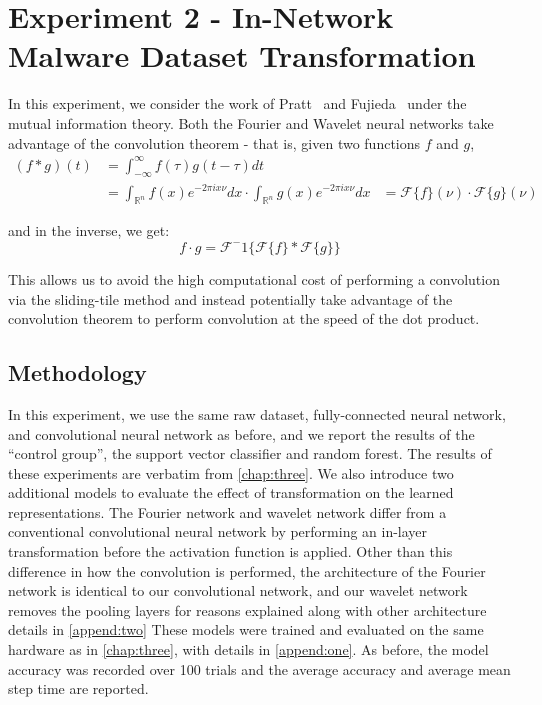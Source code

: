 \chapter{Experiment 2 - In-Network Malware Dataset Transformation}
\label{chap:four}

In this experiment, we consider the work of Pratt~\cite{pratt2017fcnn} and Fujieda~\cite{fujieda2017wavelet} under the mutual information theory.
Both the Fourier and Wavelet neural networks take advantage of the convolution theorem - that is, given two functions $f$ and $g$,
\begin{align}
(f * g)(t) & = \int_{-\infty}^{\infty} f(\tau)g(t-\tau)dt \\
& = \int_{\mathbb{R}^n}f(x) e^{-2\pi i x \nu} dx	 \cdot \int_{\mathbb{R}^n}g(x) e^{-2\pi i x \nu} dx	
& = \mathcal{F}\{f\}(\nu) \cdot \mathcal{F}\{g\}(\nu)
\end{align}

and in the inverse, we get:
$$f \cdot g = \mathcal{F}^-1\{\mathcal{F}\{f\} * \mathcal{F}\{g\}\}$$

This allows us to avoid the high computational cost of performing a convolution via the sliding-tile method and instead potentially take advantage of the convolution theorem to perform convolution at the speed of the dot product.

\section{Methodology}
In this experiment, we use the same raw dataset, fully-connected neural network, and convolutional neural network as before, and we report the results of the ``control group'', the support vector classifier and random forest.
The results of these experiments are verbatim from \ref{chap:three}.
We also introduce two additional models to evaluate the effect of transformation on the learned representations.
The Fourier network and wavelet network differ from a conventional convolutional neural network by performing an in-layer transformation before the activation function is applied. 
Other than this difference in how the convolution is performed, the architecture of the Fourier network is identical to our convolutional network, and our wavelet network removes the pooling layers for reasons explained along with other architecture details in \ref{append:two}
These models were trained and evaluated on the same hardware as in \ref{chap:three}, with details in \ref{append:one}.
As before, the model accuracy was recorded over 100 trials and the average accuracy and average mean step time are reported.

